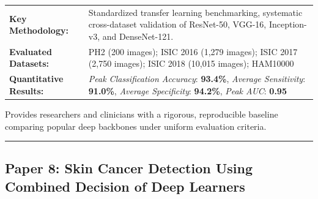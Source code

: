 \documentclass[10pt,a4paper]{article}
\begin{document}
\vspace{4pt}
\begin{tabularx}{\linewidth}{p{3.2cm}X}
\toprule
\textbf{Key Methodology:} & Standardized transfer learning benchmarking, systematic cross-dataset validation of ResNet-50, VGG-16, Inception-v3, and DenseNet-121. \\
\textbf{Evaluated Datasets:} & PH2 (200 images); ISIC 2016 (1,279 images); ISIC 2017 (2,750 images); ISIC 2018 (10,015 images); HAM10000 \\
\textbf{Quantitative Results:} & \textit{Peak Classification Accuracy}: \textbf{93.4\%}, \textit{Average Sensitivity}: \textbf{91.0\%}, \textit{Average Specificity}: \textbf{94.2\%}, \textit{Peak AUC}: \textbf{0.95} \\
\bottomrule
\end{tabularx}
\vspace{4pt}
\begin{tcolorbox}[utilitybox,title=Clinical Utility and Real-World Impact]
Provides researchers and clinicians with a rigorous, reproducible baseline comparing popular deep backbones under uniform evaluation criteria.
\end{tcolorbox}
\vspace{12pt}
\hrule
\vspace{12pt}
\subsection*{Paper 8: Skin Cancer Detection Using Combined Decision of Deep Learners}
\end{document}

